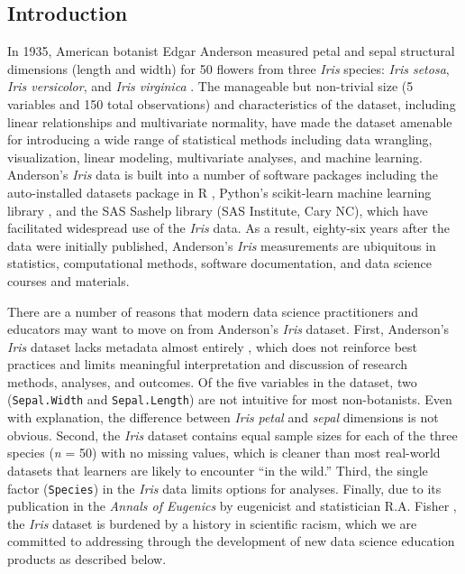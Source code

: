 \hypertarget{introduction}{%
\subsection{Introduction}\label{introduction}}

In 1935, American botanist Edgar Anderson measured petal and sepal
structural dimensions (length and width) for 50 flowers from three
\emph{Iris} species: \emph{Iris setosa}, \emph{Iris versicolor}, and
\emph{Iris virginica} \citep{anderson_irises_1935}. The manageable but
non-trivial size (5 variables and 150 total observations) and
characteristics of the dataset, including linear relationships and
multivariate normality, have made the dataset amenable for introducing a
wide range of statistical methods including data wrangling,
visualization, linear modeling, multivariate analyses, and machine
learning. Anderson's \emph{Iris} data is built into a number of software
packages including the auto-installed datasets package in R
\citep{r_core_team_r_2019}, Python's scikit-learn machine learning
library \citep{pedregosa_scikit-learn_2011}, and the SAS Sashelp library
(SAS Institute, Cary NC), which have facilitated widespread use of the
\emph{Iris} data. As a result, eighty-six years after the data were
initially published, Anderson's \emph{Iris} measurements are ubiquitous
in statistics, computational methods, software documentation, and data
science courses and materials.

There are a number of reasons that modern data science practitioners and
educators may want to move on from Anderson's \emph{Iris} dataset.
First, Anderson's \emph{Iris} dataset lacks metadata almost entirely
\citep{anderson_irises_1935}, which does not reinforce best practices
and limits meaningful interpretation and discussion of research methods,
analyses, and outcomes. Of the five variables in the dataset, two
(\texttt{Sepal.Width} and \texttt{Sepal.Length}) are not intuitive for
most non-botanists. Even with explanation, the difference between
\emph{Iris} \emph{petal} and \emph{sepal} dimensions is not obvious.
Second, the \emph{Iris} dataset contains equal sample sizes for each of
the three species (\emph{n} = 50) with no missing values, which is
cleaner than most real-world datasets that learners are likely to
encounter ``in the wild.'' Third, the single factor (\texttt{Species})
in the \emph{Iris} data limits options for analyses. Finally, due to its
publication in the \emph{Annals of Eugenics} by eugenicist and
statistician R.A. Fisher \citep{fisher_use_1936}, the \emph{Iris}
dataset is burdened by a history in scientific racism, which we are
committed to addressing through the development of new data science
education products as described below.

